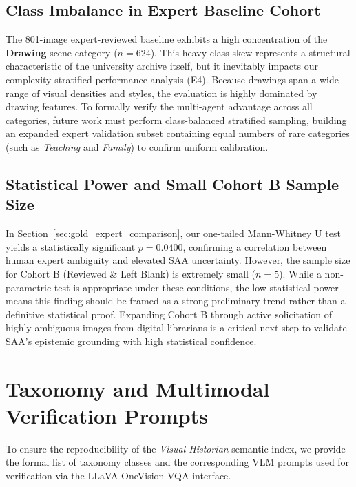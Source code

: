 \documentclass[12pt,onecolumn,a4paper]{IEEEtran}
\begin{document}
\subsection{Class Imbalance in Expert Baseline Cohort}
The 801-image expert-reviewed baseline exhibits a high concentration of the \textbf{Drawing} scene category ($n=624$). This heavy class skew represents a structural characteristic of the university archive itself, but it inevitably impacts our complexity-stratified performance analysis (E4). Because drawings span a wide range of visual densities and styles, the evaluation is highly dominated by drawing features. To formally verify the multi-agent advantage across all categories, future work must perform class-balanced stratified sampling, building an expanded expert validation subset containing equal numbers of rare categories (such as \textit{Teaching} and \textit{Family}) to confirm uniform calibration.

\subsection{Statistical Power and Small Cohort B Sample Size}
In Section~\ref{sec:gold_expert_comparison}, our one-tailed Mann-Whitney U test yields a statistically significant $p = 0.0400$, confirming a correlation between human expert ambiguity and elevated SAA uncertainty. However, the sample size for Cohort B (Reviewed \& Left Blank) is extremely small ($n=5$). While a non-parametric test is appropriate under these conditions, the low statistical power means this finding should be framed as a strong preliminary trend rather than a definitive statistical proof. Expanding Cohort B through active solicitation of highly ambiguous images from digital librarians is a critical next step to validate SAA's epistemic grounding with high statistical confidence.

\clearpage
\appendix
\section{Taxonomy and Multimodal Verification Prompts}
To ensure the reproducibility of the \textit{Visual Historian} semantic index, we provide the formal list of taxonomy classes and the corresponding VLM prompts used for verification via the LLaVA-OneVision VQA interface.
\end{document}
